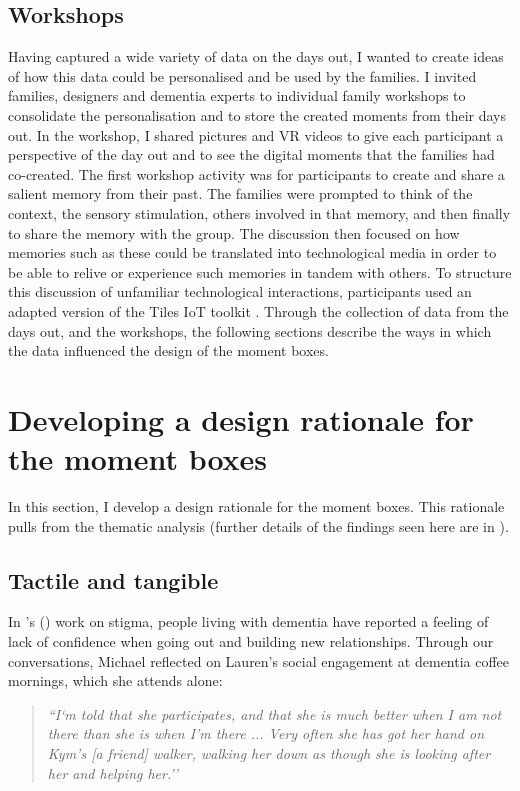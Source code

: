 \subsection{Workshops}
\label{workshops}
Having captured a wide variety of data on the days out, I wanted to create ideas of how this data could be personalised and be used by the families. I invited families, designers and dementia experts to individual family workshops to consolidate the personalisation and to store the created moments from their days out. In the workshop, I shared pictures and VR videos to give each participant a perspective of the day out and to see the digital moments that the families had co-created. The first workshop activity was for participants to create and share a salient memory from their past. The families were prompted to think of the context, the sensory stimulation, others involved in that memory, and then finally to share the memory with the group. The discussion then focused on how memories such as these could be translated into technological media in order to be able to relive or experience such memories in tandem with others. To structure this discussion of unfamiliar technological interactions, participants used an adapted version of the Tiles IoT toolkit \citep{mora2017tiles}. Through the collection of data from the days out, and the workshops, the following sections describe the ways in which the data influenced the design of the moment boxes.

\section{Developing a design rationale for the moment boxes}
\label{DesignRationale}
In this section, I develop a design rationale for the moment boxes. This rationale pulls from the thematic analysis (further details of the findings seen here are in \citep{hodge_exploring_2019}). 

\subsection{Tactile and tangible}
\label{DR:TactileTangible}
In \citeauthor{nolan_perceptions_2006}'s (\citeyear{nolan_perceptions_2006}) work on stigma, people living with dementia have reported a feeling of lack of confidence when going out and building new relationships. Through our conversations, Michael reflected on Lauren's social engagement at dementia coffee mornings, which she attends alone:

\begin{quote}
\textit{    ``I`m told that she participates, and that she is much better when I am not there than she is when I’m there ... Very often she has got her hand on Kym’s [a friend] walker, walking her down as though she is looking after her and helping her.''
}
\end{quote}

